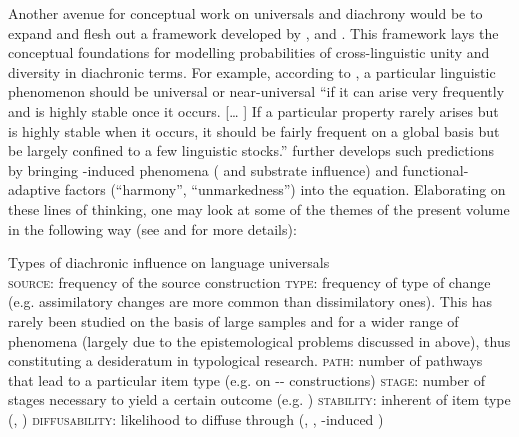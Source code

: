 \documentclass[output=paper]{langsci/langscibook}
\begin{document}
Another avenue for conceptual work on universals and diachrony would be to expand and flesh out a framework developed by \citet{Greenberg1978_Diachr}, \citet{Nichols1992,Nichols2003} and \citet{Bickel2013}. This framework lays the conceptual foundations for modelling probabilities of cross-linguistic unity and diversity in diachronic terms. For example, according to \citet[76]{Greenberg1978_Diachr}, a particular linguistic phenomenon should be universal or near-universal “if it can arise very frequently and is highly stable once it occurs. [… ] If a particular property rarely arises but is highly stable when it occurs, it should be fairly frequent on a global basis but be largely confined to a few linguistic stocks.” \citet[287--288]{Nichols2008_Diach} further develops such predictions by bringing -induced phenomena ( and substrate influence) and functional-adaptive factors (“harmony”, “unmarkedness”) into the equation. Elaborating on these lines of thinking, one may look at some of the themes of the present volume in the following way (see \citealt{Grossman2016} and \citealt{GrossmanEtAl2018} for more details):

\ea
Types of diachronic influence on language universals\\
  \ea \textsc{source}: frequency of the source construction 
  \ex \textsc{type}: frequency of type of change (e.g. assimilatory changes are more common than dissimilatory ones). This has rarely been studied on the basis of large samples and for a wider range of phenomena (largely due to the epistemological problems discussed in  above), thus constituting a desideratum in typological research.
  \ex \textsc{path}: number of pathways that lead to a particular item type (e.g. \citealt{BybeeEtAl1994} on -- constructions)
  \ex \textsc{stage}: number of stages necessary to yield a certain outcome (e.g. \citealt{Harris2008})
  \ex \textsc{stability}: inherent  of item type (\citealt{Greenberg1978_Diachr}, \citealt{Nichols2003}) 
  \ex \textsc{diffusability:} likelihood to diffuse through  (, , -induced )
  \z
\z
\end{document}
